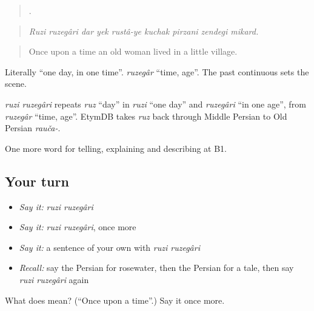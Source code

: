 \begin{quote}
        .
\end{quote}

\begin{quote}
\emph{Ruzi ruzegâri dar yek rustâ-ye kuchak pirzani zendegi mikard.}
\end{quote}

\begin{quote}
Once upon a time an old woman lived in a little village.
\end{quote}

Literally \textquotedblleft{}one day, in one time\textquotedblright{}. \emph{ruzegâr} \textquotedblleft{}time, age\textquotedblright{}. The past continuous sets the scene.

\begin{cousinweb}
\emph{ruzi ruzegâri} repeats \emph{ruz} \textquotedblleft{}day\textquotedblright{} in \emph{ruzi} \textquotedblleft{}one day\textquotedblright{} and \emph{ruzegâri} \textquotedblleft{}in one age\textquotedblright{}, from \emph{ruzegâr} \textquotedblleft{}time, age\textquotedblright{}. EtymDB takes \emph{ruz} back through Middle Persian to Old Persian \emph{rauča-}.
\end{cousinweb}

\begin{grammarlens}[title={What you've built}]
One more word for telling, explaining and describing at B1.
\end{grammarlens}

\subsection*{Your turn}
\begin{itemize}
\raggedright
  \item \emph{Say it:} \emph{ruzi ruzegâri}
  \item \emph{Say it:} \emph{ruzi ruzegâri}, once more
  \item \emph{Say it:} a sentence of your own with \emph{ruzi ruzegâri}
  \item \emph{Recall:} say the Persian for rosewater, then the Persian for a tale, then say \emph{ruzi ruzegâri} again
\end{itemize}

\begin{tcolorbox}[breakable,colback=teal!4,colframe=teal!35!black,title={Before you move on}]
What does   mean? (\textquotedblleft{}Once upon a time\textquotedblright{}.) Say it once more.
\end{tcolorbox}

